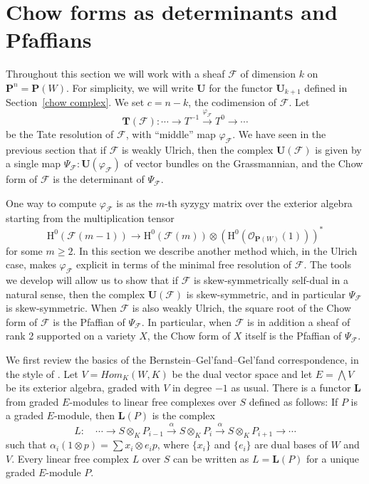\documentclass{jams-l}
\theoremstyle{definition}
\theoremstyle{remark}
\newcommand{\F}{{\mathcal F}}
\newcommand{\Hrm}{{\mathrm H}}
\newcommand{\LL}{{\mathbf L}}
\newcommand{\cO}{{\mathcal O}}
\newcommand{\PP}{{\mathbf P}}
\newcommand{\TT}{{\mathbf T}}
\newcommand{\UU}{{\mathbf U}}
\newcommand{\tensor}{\otimes}
\newcommand{\rTo}{\xrightarrow}
\newcommand{\rTox}{\rightarrow}
\begin{document}
\section{Chow forms as determinants and Pfaffians}\label{atiyah} 

Throughout this section we will work with a sheaf $\F$ of
dimension $k$ on $\PP^n=\PP(W)$. For simplicity, we will write
$\UU$ for the functor $\UU_{k+1}$ defined in Section~\ref{chow complex}.
We set $c=n-k$, the codimension of $\F$. Let 
\[
\TT(\F): \cdots \rTox T^{-1}\rTo{\varphi_\F} T^0\rTox \cdots
\]
be the Tate resolution of $\F$, with ``middle'' map
 $\varphi_\F$.
We have seen in the previous section that
if $\F$ is weakly Ulrich,
then the complex $\UU(\F)$ is given by a single map
$\Psi_\F: \UU(\varphi_\F)$
of vector bundles on the Grassmannian, and the Chow form
of $\F$ is the determinant of $\Psi_\F$.
 
One way to compute $\varphi_\F$ is as the $m$-th syzygy matrix
over the exterior algebra starting from the multiplication tensor
\[
\Hrm^0(\F(m-1)) \to \Hrm^0(\F(m)) \tensor (\Hrm^0(\cO_{\PP(W)}(1)))^*
\]
for some $m\ge 2$. 
In this section we
describe another method which, in the Ulrich case,
makes $\varphi_\F$ explicit in terms of the minimal free resolution of $\F$. 
The tools we develop
will allow us to show that if $\F$ is skew-symmetrically self-dual
in a natural sense, then the complex $\UU(\F)$ is skew-symmetric, 
and in particular $\Psi_\F$ is skew-symmetric.
When $\F$ is also weakly Ulrich, the square root
of the Chow form of $\F$ is the Pfaffian of $\Psi_\F$.
In particular, when $\F$ is in addition a sheaf of rank
2 supported on a variety $X$, the Chow form of $X$
itself is the Pfaffian of $\Psi_\F$.

We first review the basics of the Bernstein--Gel'fand--Gel'fand 
correspondence, \cite{BernsteinGelfandandGelfand1978}
in the style of \cite{Eisenbudetal.2001}.
Let $V=Hom_K(W,K)$ be the dual vector space and
let $E=\bigwedge V$ be its exterior algebra,
graded with $V$ in degree $-1$ as usual. There is
a functor $\LL$ from graded $E$-modules to linear free
complexes over $S$ defined as follows:
If $P$ is a graded $E$-module, then $\LL(P)$
is the complex
\[
L:\quad \cdots \rTox S\otimes_K P_{i-1} \rTo{\alpha} S\otimes_K P_{i} 
\rTo{\alpha} S\otimes_K P_{i+1} \rTox \cdots
\]
such that $\alpha_i(1\otimes p) = \sum x_i\otimes e_ip$,
where $\{x_i\}$ and $\{e_i\}$ are dual bases of $W$ and $V$.
Every linear free complex $L$ over $S$ can be written as
$L=\LL(P)$ for a unique graded $E$-module $P$. 
\end{document}
